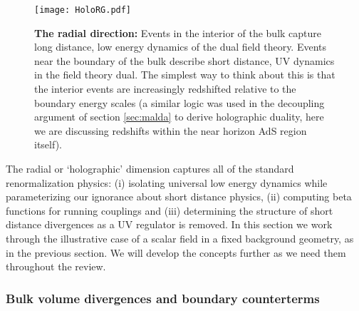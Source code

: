 \documentclass[10pt, oneside]{book}
\begin{document}
\begin{doublespace}
\begin{figure}[h]
\centering
\texttt{[image: HoloRG.pdf]}
\caption{\label{fig:RG} {\bf The radial direction:} Events in the interior of the bulk capture long distance, low energy dynamics of the dual field theory. Events near the boundary of the bulk describe short distance, UV dynamics in the field theory dual. The simplest way to think about this is that the interior events are increasingly redshifted relative to the boundary energy scales (a similar logic was used in the decoupling argument of section \ref{sec:malda} to derive holographic duality, here we are discussing redshifts within the near horizon AdS region itself).}
\end{figure}

The radial or `holographic' dimension captures all of the standard renormalization physics: (i) isolating universal low energy dynamics while parameterizing our ignorance about short distance physics, (ii) computing beta functions for running couplings and (iii) determining the structure of short distance divergences as a UV regulator is removed. In this  section we work through the illustrative case of a scalar field in a fixed background geometry, as in the previous section. We will develop the concepts further as we need them throughout the review.

\subsubsection{Bulk volume divergences and boundary counterterms}


\end{doublespace}
\end{document}
